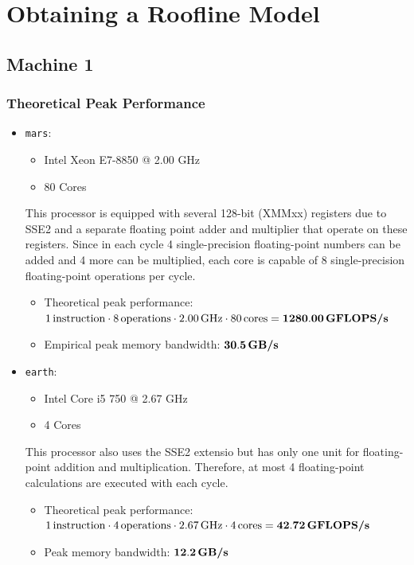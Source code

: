 
\lstset{
	basicstyle=\small,
	language=C
}

\section{Obtaining a Roofline Model}

\subsection{Machine 1}

\subsubsection{Theoretical Peak Performance}
\begin{itemize}
	\item \texttt{mars}:
	\begin{itemize}
		\item Intel Xeon E7-8850 @ 2.00 GHz
		\item 80 Cores
	\end{itemize}
	This processor is equipped with several 128-bit (XMMxx) registers due to SSE2 and a separate floating point adder and multiplier that operate on these registers. Since in each cycle 4 single-precision floating-point numbers can be added and 4 more can be multiplied, each core is capable of 8 single-precision floating-point operations per cycle. \cite{agnerorg}
	\begin{itemize}
		\item Theoretical peak performance: \\
		$1 \, \text{instruction} \cdot 8 \, \text{operations} \cdot 2.00 \, \text{GHz} \cdot 80 \, \text{cores} = \bold{1280.00} \, \textbf{GFLOPS/s}$
		
		\item Empirical peak memory bandwidth: $\bold{30.5} \, \textbf{GB/s}$ \\
	\end{itemize}
	\item \texttt{earth}:
	\begin{itemize}
		\item Intel Core i5 750 @ 2.67 GHz
		\item 4 Cores
	\end{itemize}
	This processor also uses the SSE2 extensio but has only one unit for floating-point addition and multiplication. Therefore, at most 4 floating-point calculations are executed with each cycle.
	\begin{itemize}
		\item Theoretical peak performance: \\
		$1 \, \text{instruction} \cdot 4 \, \text{operations} \cdot 2.67 \, \text{GHz} \cdot 4 \, \text{cores} = \bold{42.72 \, \textbf{GFLOPS/s}}$
		
		\item Peak memory bandwidth: $\bold{12.2} \, \textbf{GB/s}$ \\
	\end{itemize}
\end{itemize}


